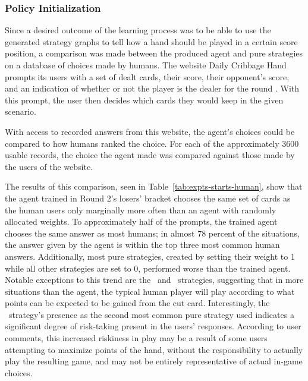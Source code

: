 

\subsubsection*{Policy Initialization}
\label{sec:findings-expts-starts}

Since a desired outcome of the learning process was to be able to use the
generated strategy graphs to tell how a hand should be played in a
certain score position,
a comparison was made between the produced agent and pure strategies
on a database of choices made by humans.
%
The website Daily Cribbage Hand
prompts its users with
a set of dealt cards,
their score,
their opponent's score,
and an indication of whether or not the player is the dealer for the round
\cite{dailycribbagehand}.
%
With this prompt,
the user then decides which cards they would
keep in the given scenario.

With access to recorded answers from this website,
the agent's choices could be compared
to how humans ranked the choice.
%
For each of the approximately 3600 usable records,
the choice the agent made was compared against those made by the users of the
website.

The results of this comparison,
seen in Table~\ref{tab:expts-starts-human}, %
show that the agent trained in Round 2's losers' bracket chooses the same
set of cards as the human users only marginally more often than an agent with 
randomly allocated weights.
%
To approximately half of the prompts,
the trained agent chooses the same answer as most humans;
in almost 78 percent of the situations,
the answer given by the agent is within the top three most common human answers.
%
Additionally,
most pure strategies,
created by setting their weight to 1 while all other strategies are set to 0,
performed worse than the trained agent.
%
Notable exceptions to this trend are the \handmaxposs\ and \handmaxavg\ 
strategies,
suggesting that in more situations than the agent,
the typical human player will play according to what points can be expected
to be gained from the cut card.
%
Interestingly,
the \handmaxposs\ strategy's presence as the second most common pure strategy
used indicates a significant degree of risk-taking present in the users'
responses.
%
According to user comments,
this increased riskiness in play
may be a result of some users attempting to maximize points of the hand,
without the responsibility to actually play the resulting game,
and may not be entirely representative of actual in-game choices.

